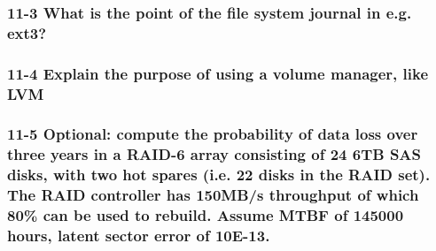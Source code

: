 \subsubsection{11-3 What is the point of the file system journal in e.g. ext3?}

\subsubsection{11-4 Explain the purpose of using a volume manager, like LVM}

\subsubsection{11-5 Optional: compute the probability of data loss over three years in a RAID-6 array consisting of 24 6TB SAS disks, with two hot spares (i.e. 22 disks in the RAID set). The RAID controller has 150MB/s throughput of which 80\% can be used to rebuild. Assume MTBF of 145000 hours, latent sector error of 10E-13.}



